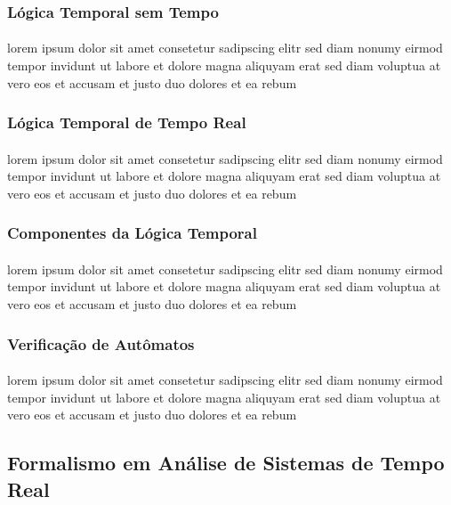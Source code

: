 \subsubsection{Lógica Temporal sem Tempo}
\paragraph{}
lorem ipsum dolor sit amet consetetur sadipscing elitr sed diam nonumy
eirmod tempor invidunt ut labore et dolore magna aliquyam erat sed diam
voluptua at vero eos et accusam et justo duo dolores et ea rebum

\subsubsection{Lógica Temporal de Tempo Real}
\paragraph{}
lorem ipsum dolor sit amet consetetur sadipscing elitr sed diam nonumy
eirmod tempor invidunt ut labore et dolore magna aliquyam erat sed diam
voluptua at vero eos et accusam et justo duo dolores et ea rebum

\subsubsection{Componentes da Lógica Temporal}
\paragraph{}
lorem ipsum dolor sit amet consetetur sadipscing elitr sed diam nonumy
eirmod tempor invidunt ut labore et dolore magna aliquyam erat sed diam
voluptua at vero eos et accusam et justo duo dolores et ea rebum

\subsubsection{Verificação de Autômatos}
\paragraph{}
lorem ipsum dolor sit amet consetetur sadipscing elitr sed diam nonumy
eirmod tempor invidunt ut labore et dolore magna aliquyam erat sed diam
voluptua at vero eos et accusam et justo duo dolores et ea rebum

\subsection{Formalismo em Análise de Sistemas de Tempo Real}
